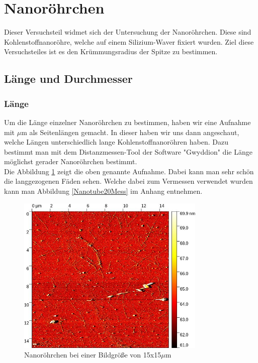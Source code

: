 

\section{Nanoröhrchen}
Dieser Versuchsteil widmet sich der Untersuchung der Nanoröhrchen. Diese sind Kohlenstoffnanoröhre, welche auf einem Silizium-Waver 
fixiert wurden. Ziel diese Versuchsteiles ist es den Krümmungsradius der Spitze zu bestimmen.
\subsection{Länge und Durchmesser}
\subsubsection*{Länge}
Um die Länge einzelner Nanoröhrchen zu bestimmen, haben wir eine Aufnahme mit  $\mu$m als Seitenlängen gemacht. In dieser haben wir uns 
dann angeschaut, welche Längen unterschiedlich lange Kohlenstoffnanoröhren haben. Dazu bestimmt man mit dem Distanzmessen-Tool der Software 
"Gwyddion" \footnotemark {} die Länge möglichst gerader Nanoröhrchen bestimmt. \\
Die Abbildung \ref{Nanotube20} zeigt die oben genannte Aufnahme. Dabei kann man sehr schön die langgezogenen Fäden sehen. Welche dabei zum Vermessen verwendet wurden 
kann man Abbildung \ref{Nanotube20Mess} im Anhang entnehmen.

\begin{figure}
    \centering
    \includegraphics[width = 9cm]{Bilder/Nanotubes/NanoTube15um.jpg}
    \caption{Nanoröhrchen bei einer Bildgröße von 15x15$\mu$m}
    \label{Nanotube20}
\end{figure}

